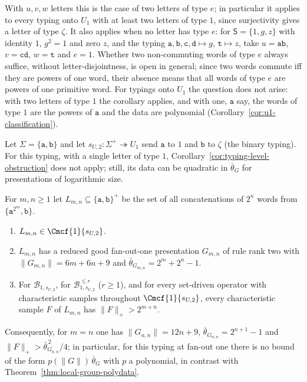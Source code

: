With $u,v,w$ letters this is the case of two letters of type $e$; in
particular it applies to every typing onto $U_1$ with at least two letters of
type $1$, since surjectivity gives a letter of type $\zeta$.  It also applies
when no letter has type $e$: for $\mathsf S=\{1,g,z\}$ with identity $1$,
$g^2=1$ and zero $z$, and the typing $\mathtt a,\mathtt b,\mathtt c,\mathtt d\mapsto g$,
$\mathtt t\mapsto z$, take $u=\mathtt{ab}$, $v=\mathtt{cd}$, $w=\mathtt t$ and
$e=1$.  Whether two non-commuting words of type $e$ always suffice, without
letter-disjointness, is open in general; since two words commute iff they are
powers of one word, their absence means that all words of type $e$ are powers of
one primitive word.  For typings onto $U_1$ the question does not arise: with
two letters of type $1$ the corollary applies, and with one, $\mathtt a$ say, the
words of type $1$ are the powers of $\mathtt a$ and the data are polynomial
(Corollary~\ref{cor:u1-classification}).

Let $\Sigma=\{\mathtt a,\mathtt b\}$ and let $s_{U,2}:\Sigma^+\twoheadrightarrow U_1$ send $\mathtt a$ to
$1$ and $\mathtt b$ to $\zeta$ (the binary typing).  For this typing, with a single letter of type $1$,
Corollary~\ref{cor:typing-level-obstruction} does not apply; still, its data can
be quadratic in $\bar\theta_G$ for presentations of logarithmic size.

\begin{proposition}
\label{prop:binary-u1-quadratic}
For $m,n\ge1$ let $L_{m,n}\subseteq\{\mathtt a,\mathtt b\}^+$ be the set of all
concatenations of $2^n$ words from $\{\mathtt a^{2^m},\mathtt b\}$.
\begin{enumerate}[label=\textup{(\roman*)},leftmargin=*]
\item $L_{m,n}\in\Cmcf{1}{s_{U,2}}$.
\item $L_{m,n}$ has a reduced good fan-out-one presentation $G_{m,n}$ of rule rank
two with $\|G_{m,n}\|=6m+6n+9$ and $\bar\theta_{G_{m,n}}=2^m+2^n-1$.
\item For $\mathcal B_{1,s_{U,2}}$, for $\mathcal B^{\le r}_{1,s_{U,2}}$ \textup($r\ge1$\textup),
and for every set-driven operator with characteristic samples throughout
$\Cmcf{1}{s_{U,2}}$, every characteristic sample $F$ of $L_{m,n}$ has
$\|F\|_+>2^{m+n}$.
\end{enumerate}
Consequently, for $m=n$ one has $\|G_{n,n}\|=12n+9$, $\bar\theta_{G_{n,n}}=2^{n+1}-1$
and $\|F\|_+>\bar\theta_{G_{n,n}}^{\,2}/4$; in particular, for this typing at
fan-out one there is no bound of the form $p(\|G\|)\,\bar\theta_G$ with $p$ a
polynomial, in contrast with Theorem~\ref{thm:local-group-polydata}.
\end{proposition}

